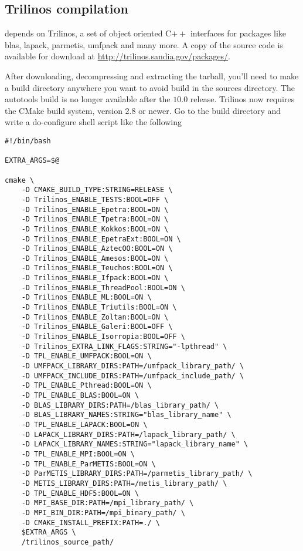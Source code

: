 \subsection{Trilinos compilation}
\lifev depends on Trilinos, a set of object oriented C$++$ interfaces for packages like
blas, lapack, parmetis, umfpack and many more. A copy of the source
code is available for download at \url{http://trilinos.sandia.gov/packages/}.

After downloading, decompressing and extracting the tarball, you'll need to
make a build directory anywhere you want to avoid build in the sources directory.
The autotools build is no longer available after the $10.0$ release.
Trilinos now requires the CMake
build system, version $2.8$ or newer.
Go to the build directory and write a do-configure shell script like the following


\begin{verbatim}
#!/bin/bash

EXTRA_ARGS=$@

cmake \
    -D CMAKE_BUILD_TYPE:STRING=RELEASE \
    -D Trilinos_ENABLE_TESTS:BOOL=OFF \
    -D Trilinos_ENABLE_Epetra:BOOL=ON \
    -D Trilinos_ENABLE_Tpetra:BOOL=ON \
    -D Trilinos_ENABLE_Kokkos:BOOL=ON \
    -D Trilinos_ENABLE_EpetraExt:BOOL=ON \
    -D Trilinos_ENABLE_AztecOO:BOOL=ON \
    -D Trilinos_ENABLE_Amesos:BOOL=ON \
    -D Trilinos_ENABLE_Teuchos:BOOL=ON \
    -D Trilinos_ENABLE_Ifpack:BOOL=ON \
    -D Trilinos_ENABLE_ThreadPool:BOOL=ON \
    -D Trilinos_ENABLE_ML:BOOL=ON \
    -D Trilinos_ENABLE_Triutils:BOOL=ON \
    -D Trilinos_ENABLE_Zoltan:BOOL=ON \
    -D Trilinos_ENABLE_Galeri:BOOL=OFF \
    -D Trilinos_ENABLE_Isorropia:BOOL=OFF \
    -D Trilinos_EXTRA_LINK_FLAGS:STRING="-lpthread" \
    -D TPL_ENABLE_UMFPACK:BOOL=ON \
    -D UMFPACK_LIBRARY_DIRS:PATH=/umfpack_library_path/ \
    -D UMFPACK_INCLUDE_DIRS:PATH=/umfpack_include_path/ \
    -D TPL_ENABLE_Pthread:BOOL=ON \
    -D TPL_ENABLE_BLAS:BOOL=ON \
    -D BLAS_LIBRARY_DIRS:PATH=/blas_library_path/ \
    -D BLAS_LIBRARY_NAMES:STRING="blas_library_name" \
    -D TPL_ENABLE_LAPACK:BOOL=ON \
    -D LAPACK_LIBRARY_DIRS:PATH=/lapack_library_path/ \
    -D LAPACK_LIBRARY_NAMES:STRING="lapack_library_name" \
    -D TPL_ENABLE_MPI:BOOL=ON \
    -D TPL_ENABLE_ParMETIS:BOOL=ON \
    -D ParMETIS_LIBRARY_DIRS:PATH=/parmetis_library_path/ \
    -D METIS_LIBRARY_DIRS:PATH=/metis_library_path/ \
    -D TPL_ENABLE_HDF5:BOOL=ON \
    -D MPI_BASE_DIR:PATH=/mpi_library_path/ \
    -D MPI_BIN_DIR:PATH=/mpi_binary_path/ \
    -D CMAKE_INSTALL_PREFIX:PATH=./ \
    $EXTRA_ARGS \
    /trilinos_source_path/
\end{verbatim}

